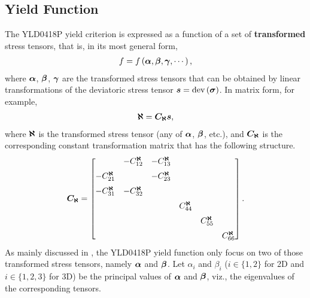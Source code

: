\subsection{Yield Function}
The YLD0418P yield criterion is expressed as a function of a set of \textbf{transformed} stress tensors, that is, in its most general form,
\begin{gather}
    f=f\left(\bm{\alpha},\bm{\beta},\bm{\gamma},\cdots\right),
\end{gather}
where $\bm{\alpha}$, $\bm{\beta}$, $\bm{\gamma}$ are the transformed stress tensors that can be obtained by linear transformations of the deviatoric stress tensor $\bm{s}=\text{dev}\left(\bm{\sigma}\right)$.
In matrix form, for example,
\begin{gather}
    \bm{\aleph}=\bm{C_\aleph}\bm{s},
\end{gather}
where $\bm{\aleph}$ is the transformed stress tensor (any of $\bm{\alpha}$, $\bm{\beta}$, etc.), and $\bm{C_\aleph}$ is the corresponding constant transformation matrix that has the following structure.
\begin{gather}
    \bm{C_\aleph}=
    \begin{bmatrix}
                              & -C^{\bm{\aleph}}_{12} & -C^{\bm{\aleph}}_{13} &                      &                      &                      \\[2mm]
        -C^{\bm{\aleph}}_{21} &                       & -C^{\bm{\aleph}}_{23} &                      &                      &                      \\[2mm]
        -C^{\bm{\aleph}}_{31} & -C^{\bm{\aleph}}_{32} &                       &                      &                      &                      \\[2mm]
                              &                       &                       & C^{\bm{\aleph}}_{44} &                      &                      \\[2mm]
                              &                       &                       &                      & C^{\bm{\aleph}}_{55} &                      \\[2mm]
                              &                       &                       &                      &                      & C^{\bm{\aleph}}_{66}
    \end{bmatrix}.
\end{gather}
As mainly discussed in \cite{Barlat2005}, the YLD0418P yield function only focus on two of those transformed stress tensors, namely $\bm{\alpha}$ and $\bm{\beta}$.
Let $\alpha_i$ and $\beta_i$ ($i\in\{1,2\}$ for 2D and $i\in\{1,2,3\}$ for 3D) be the principal values of $\bm{\alpha}$ and $\bm{\beta}$, viz., the eigenvalues of the corresponding tensors.
